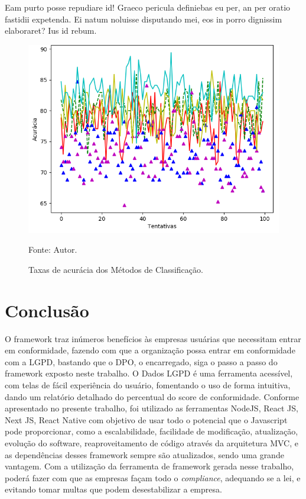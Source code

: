 \documentclass[
	12pt,				%
	openright,			%
	oneside,			%
	a4paper,			%
	english,			%
	french,				%
	spanish,			%
	brazil,				%
	]{abntex2}
\begin{document}
Eam purto posse repudiare id! Graeco pericula definiebas eu per, an per oratio fastidii expetenda. Ei natum noluisse disputando mei, eos in porro dignissim elaboraret? Ius id rebum.
\begin{figure}[ht]
    \centering
    \caption{Taxas de acurácia dos Métodos de Classificação.}
    \includegraphics[width=5.0in]{Images/acc-classification.png}
    \label{fig: grafico-acc}
    
    \centering \small Fonte: Autor.
\end{figure}

 \chapter{Conclusão}
 \label{ch: conclusao}
 O framework traz inúmeros benefícios às empresas usuárias que necessitam entrar em conformidade, fazendo com que a organização possa entrar em conformidade com a LGPD, bastando que o DPO, o encarregado, siga o passo a passo do framework exposto neste trabalho. O Dados LGPD é uma ferramenta acessível, com telas de fácil experiência do usuário, fomentando o uso de forma intuitiva, dando um relatório detalhado do percentual do score de conformidade. Conforme apresentado no presente trabalho, foi utilizado as ferramentas NodeJS, React JS, Next JS, React Native com objetivo de usar todo o potencial que o Javascript pode proporcionar, como a escalabilidade, facilidade de modificação, atualização, evolução do software, reaproveitamento de código através da arquitetura MVC, e as dependências desses framework sempre são atualizados, sendo uma grande vantagem. Com a utilização da ferramenta de framework gerada nesse trabalho, poderá fazer com que as empresas façam todo o \textit{compliance}, adequando se a lei, e evitando tomar multas que podem desestabilizar a empresa.
\end{document}
